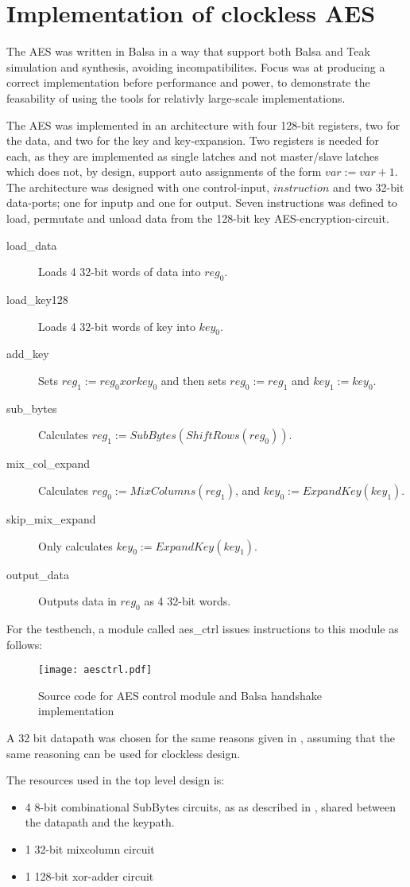 \section{Implementation of clockless AES}

The AES was written in Balsa in a way that support both Balsa and
Teak simulation and synthesis, avoiding incompatibilites. Focus was at
producing a correct implementation before performance and power, to
demonstrate the feasability of using the tools for relativly
large-scale implementations.

The AES was implemented in an architecture with four 128-bit
registers, two for the data, and two for the key and
key-expansion. Two registers is needed for each, as they are
implemented as single latches and not master/slave latches which does
not, by design, support auto assignments of the form 
$var := var + 1$. The architecture was designed with one control-input,
$instruction$ and two 32-bit data-ports; one for inputp and one for
output. Seven instructions was defined to load, permutate and unload
data from the 128-bit key AES-encryption-circuit.

\begin{description}
  \item[load\_data] Loads 4 32-bit words of data into $reg_0$.
  \item[load\_key128] Loads 4 32-bit words of key into $key_0$.
  \item[add\_key] Sets $reg_1 := reg_0 xor key_0$ and then sets $reg_0
    := reg_1$ and $key_1 := key_0$.
  \item[sub\_bytes] Calculates $reg_1 := SubBytes(ShiftRows(reg_0))$.
  \item[mix\_col\_expand] Calculates $reg_0 := MixColumns(reg_1)$, and
    $key_0 := ExpandKey(key_1)$.
  \item[skip\_mix\_expand] Only calculates $key_0 := ExpandKey(key_1)$.
  \item[output\_data] Outputs data in $reg_0$ as 4 32-bit words.
\end{description}


For the testbench, a module called aes\_ctrl issues instructions to
this module as follows:

\begin{figure}[htbp]
  \centering
  \texttt{[image: aesctrl.pdf]}
  \caption{Source code for AES control module and Balsa handshake
    implementation}
  \label{fig:aesctrl}
\end{figure}


A 32 bit datapath was chosen for the same reasons given in
\cite{ekelund}, assuming that the same reasoning can be used for
clockless design.

The resources used in the top level design is:
\begin{itemize}
   \item 4 8-bit combinational SubBytes circuits, as as described in \cite{combsbox}, shared between the datapath and the keypath.
   \item 1 32-bit mixcolumn circuit
   \item 1 128-bit xor-adder circuit
\end{itemize}
